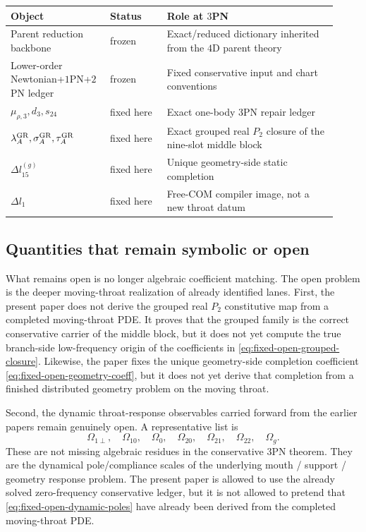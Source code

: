 \documentclass[11pt]{article}
\begin{document}
\begin{center}
\renewcommand{\arraystretch}{1.15}
\begin{tabular}{@{}>{\raggedright\arraybackslash}p{0.28\linewidth}>{\raggedright\arraybackslash}p{0.16\linewidth}>{\raggedright\arraybackslash}p{0.48\linewidth}@{}}
\textbf{Object} & \textbf{Status} & \textbf{Role at $3$PN} \\
\hline
Parent reduction backbone & frozen & Exact/reduced dictionary inherited from the $4$D parent theory \\
Lower-order Newtonian+$1$PN+$2$PN ledger & frozen & Fixed conservative input and chart conventions \\
$\mu_{\rho,3},d_3,s_{24}$ & fixed here & Exact one-body $3$PN repair ledger \\
$\lambda_A^{\rm GR},\sigma_A^{\rm GR},\tau_A^{\rm GR}$ & fixed here & Exact grouped real $P_2$ closure of the nine-slot middle block \\
$\Delta l_{15}^{(g)}$ & fixed here & Unique geometry-side static completion \\
$\Delta l_1$ & fixed here & Free-COM compiler image, not a new throat datum \\
\end{tabular}
\end{center}

\subsection{Quantities that remain symbolic or open}
\label{sec:fixed-open-open}

What remains open is no longer algebraic coefficient matching.  The open problem
is the deeper moving-throat realization of already identified lanes.  First, the
present paper does not derive the grouped real $P_2$ constitutive map from a
completed moving-throat PDE.  It proves that the grouped family is the correct
conservative carrier of the middle block, but it does not yet compute the true
branch-side low-frequency origin of the coefficients in
\eqref{eq:fixed-open-grouped-closure}.  Likewise, the paper fixes the unique
geometry-side completion coefficient \eqref{eq:fixed-open-geometry-coeff}, but
it does not yet derive that completion from a finished distributed geometry
problem on the moving throat.

Second, the dynamic throat-response observables carried forward from the earlier
papers remain genuinely open.  A representative list is
\begin{equation}
\Omega_{1\perp},\quad
\Omega_{10},\quad
\Omega_0,\quad
\Omega_{20},\quad
\Omega_{21},\quad
\Omega_{22},\quad
\Omega_g.
\label{eq:fixed-open-dynamic-poles}
\end{equation}
These are not missing algebraic residues in the conservative $3$PN theorem.
They are the dynamical pole/compliance scales of the underlying mouth / support /
geometry response problem.  The present paper is allowed to use the already
solved zero-frequency conservative ledger, but it is not allowed to pretend that
\eqref{eq:fixed-open-dynamic-poles} have already been derived from the completed
moving-throat PDE.
\end{document}
